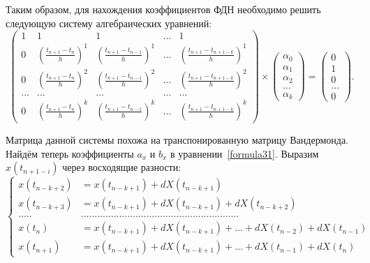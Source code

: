 Таким образом, для нахождения коэффициентов ФДН необходимо решить следующую систему алгебраических уравнений:
\begin{equation}
\label{formula39}
\begin{pmatrix}
1 & 1 & 1 & \dots & 1 \\
0 & \left(\frac{t_{n+1}-t_n}{h} \right)^1 & \left(\frac{t_{n+1}-t_{n-1}}{h} \right)^1 & \dots & \left(\frac{t_{n+1}-t_{n+1-k}}{h} \right)^1 \\
0 & \left(\frac{t_{n+1}-t_n}{h} \right)^2 & \left(\frac{t_{n+1}-t_{n-1}}{h} \right)^2 & \dots & \left(\frac{t_{n+1}-t_{n+1-k}}{h} \right)^2 \\
\dots & \dots & \dots & \dots & \dots \\
0 & \left(\frac{t_{n+1}-t_n}{h} \right)^k & \left(\frac{t_{n+1}-t_{n-1}}{h} \right)^k & \dots & \left(\frac{t_{n+1}-t_{n+1-k}}{h} \right)^k
\end{pmatrix} \times 
\begin{pmatrix}
\alpha_0 \\
\alpha_1 \\
\alpha_2 \\
\dots \\
\alpha_k
\end{pmatrix} =
\begin{pmatrix}
0 \\
1 \\
0 \\
\dots \\
0
\end{pmatrix}.
\end{equation}

Матрица данной системы похожа на транспонированную матрицу Вандермонда. Найдём теперь коэффициенты $a_x$ и $b_x$ в уравнении~\eqref{formula31}. Выразим $x(t_{n+1-i})$ через восходящие разности:
\begin{equation}
\label{formula310}
\left\{
\begin{aligned}
x(t_{n-k+2}) & = x(t_{n-k+1}) + dX(t_{n-k+1}) \\
x(t_{n-k+3}) & = x(t_{n-k+1}) + dX(t_{n-k+1}) + dX(t_{n-k+2}) \\
..... & .......................................................... \\
x(t_n) & = x(t_{n-k+1}) + dX(t_{n-k+1}) + \dots + dX(t_{n-2}) + dX(t_{n-1}) \\
x(t_{n+1}) & = x(t_{n-k+1}) + dX(t_{n-k+1}) + \dots + dX(t_{n-1}) + dX(t_n)
\end{aligned}
\right.
\end{equation}

